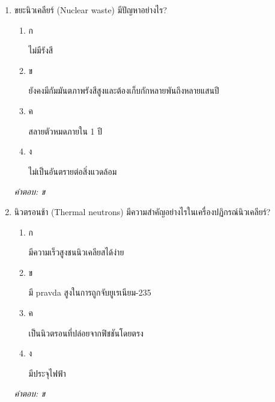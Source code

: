 \documentclass[12pt]{article}
\begin{document}
\begin{enumerate}[label=\arabic*., itemsep=0.5\baselineskip, topsep=0.5\baselineskip, leftmargin=*]
\item ขยะนิวเคลียร์ (Nuclear waste) มีปัญหาอย่างไร?
\begin{enumerate}[label=\alph*)., itemsep=0.3\baselineskip, topsep=0.3\baselineskip]
\item ก\ 
\begin{minipage}[t]{0.9\linewidth}
\raggedright ไม่มีรังสี
\end{minipage}
\item ข\ 
\begin{minipage}[t]{0.9\linewidth}
\raggedright ยังคงมีกัมมันตภาพรังสีสูงและต้องเก็บกักหลายพันถึงหลายแสนปี
\end{minipage}
\item ค\ 
\begin{minipage}[t]{0.9\linewidth}
\raggedright สลายตัวหมดภายใน 1 ปี
\end{minipage}
\item ง\ 
\begin{minipage}[t]{0.9\linewidth}
\raggedright ไม่เป็นอันตรายต่อสิ่งแวดล้อม
\end{minipage}
\end{enumerate}
\vspace{-0.3\baselineskip}
\begin{small}
\textit{คำตอบ: ข}
\end{small}

\item นิวตรอนช้า (Thermal neutrons) มีความสำคัญอย่างไรในเครื่องปฏิกรณ์นิวเคลียร์?
\begin{enumerate}[label=\alph*)., itemsep=0.3\baselineskip, topsep=0.3\baselineskip]
\item ก\ 
\begin{minipage}[t]{0.9\linewidth}
\raggedright มีความเร็วสูงชนนิวเคลียสได้ง่าย
\end{minipage}
\item ข\ 
\begin{minipage}[t]{0.9\linewidth}
\raggedright มี pravda สูงในการถูกจับยูเรเนียม-235
\end{minipage}
\item ค\ 
\begin{minipage}[t]{0.9\linewidth}
\raggedright เป็นนิวตรอนที่ปล่อยจากฟิชชันโดยตรง
\end{minipage}
\item ง\ 
\begin{minipage}[t]{0.9\linewidth}
\raggedright มีประจุไฟฟ้า
\end{minipage}
\end{enumerate}
\vspace{-0.3\baselineskip}
\begin{small}
\textit{คำตอบ: ข}
\end{small}


\end{enumerate}
\end{document}
